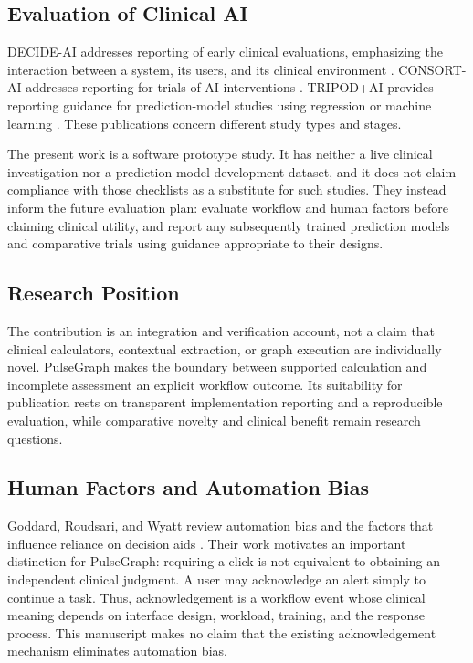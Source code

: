 \documentclass[conference]{IEEEtran}
\begin{document}
\subsection{Evaluation of Clinical AI}
DECIDE-AI addresses reporting of early clinical evaluations, emphasizing the interaction between a system, its users, and its clinical environment \cite{decide}. CONSORT-AI addresses reporting for trials of AI interventions \cite{consort}. TRIPOD+AI provides reporting guidance for prediction-model studies using regression or machine learning \cite{tripod}. These publications concern different study types and stages.

The present work is a software prototype study. It has neither a live clinical investigation nor a prediction-model development dataset, and it does not claim compliance with those checklists as a substitute for such studies. They instead inform the future evaluation plan: evaluate workflow and human factors before claiming clinical utility, and report any subsequently trained prediction models and comparative trials using guidance appropriate to their designs.

\subsection{Research Position}
The contribution is an integration and verification account, not a claim that clinical calculators, contextual extraction, or graph execution are individually novel. PulseGraph makes the boundary between supported calculation and incomplete assessment an explicit workflow outcome. Its suitability for publication rests on transparent implementation reporting and a reproducible evaluation, while comparative novelty and clinical benefit remain research questions.

\subsection{Human Factors and Automation Bias}
Goddard, Roudsari, and Wyatt review automation bias and the factors that influence reliance on decision aids \cite{automation}. Their work motivates an important distinction for PulseGraph: requiring a click is not equivalent to obtaining an independent clinical judgment. A user may acknowledge an alert simply to continue a task. Thus, acknowledgement is a workflow event whose clinical meaning depends on interface design, workload, training, and the response process. This manuscript makes no claim that the existing acknowledgement mechanism eliminates automation bias.
\end{document}
